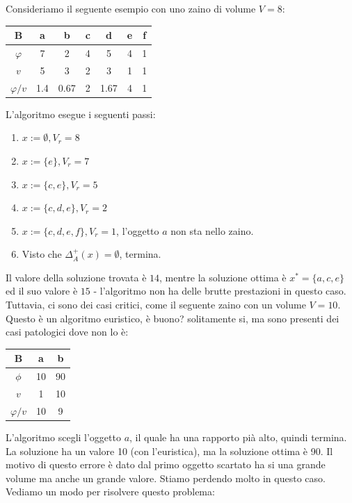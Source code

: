 \documentclass{article}
\begin{document}
    Consideriamo il seguente esempio con uno zaino di volume $V=8$:
    \begin{center}
        \begin{tabular}{c | c c c c c c}
            B             & a   & b    & c & d    & e & f \\
            \midrule
            $\varphi$     & 7   & 2    & 4 & 5    & 4 & 1 \\
            $v$           & 5   & 3    & 2 & 3    & 1 & 1 \\
            \midrule
            $\varphi / v$ & 1.4 & 0.67 & 2 & 1.67 & 4 & 1 \\
        \end{tabular}
    \end{center}
    L'algoritmo esegue i seguenti passi:
    \begin{enumerate}
        \item $x:=\emptyset, V_r=8$
        \item $x:=\{e\}, V_r=7$
        \item $x:=\{c,e\}, V_r=5$
        \item $x:=\{c,d,e\}, V_r=2$
        \item $x:=\{c,d,e,f\}, V_r=1$, l'oggetto $a$ non sta nello zaino.
        \item Visto che $\Delta_A^+(x)=\emptyset$, termina.
    \end{enumerate}
    Il valore della soluzione trovata è $14$, mentre la soluzione ottima è $x^*=\{a,c,e\}$ ed
    il suo valore è $15$ - l'algoritmo non ha delle brutte prestazioni in questo caso. Tuttavia,
    ci sono dei casi critici, come il seguente zaino con un volume $V=10$. Questo è un algoritmo euristico,
    è buono? solitamente si, ma sono presenti dei casi patologici dove non lo è:
    \begin{center}
        \begin{tabular}{c|c c}
            B           & a  & b  \\
            \midrule
            $\phi$      & 10 & 90 \\
            $v$         & 1  & 10 \\
            \midrule
            $\varphi/v$ & 10 & 9  \\
        \end{tabular}
    \end{center}

    L'algoritmo scegli l'oggetto $a$, il quale ha una rapporto pià alto, quindi termina. La soluzione
    ha un valore 10 (con l'euristica), ma la soluzione ottima è 90. Il motivo di questo errore
    è dato dal primo oggetto scartato ha si una grande volume ma anche un grande valore. Stiamo
    perdendo molto in questo caso.\\Vediamo un modo per risolvere questo problema:
\end{document}
